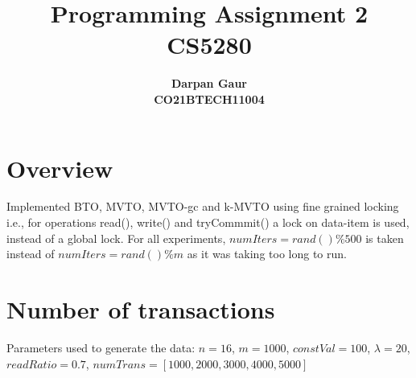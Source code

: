 \documentclass[12pt]{article}
\title{
    \textbf{Programming Assignment 2} \\ 
    \textbf{CS5280} \\
}
\author{
    \textbf{Darpan Gaur} \\
    \textbf{CO21BTECH11004}
}
\date{}
\begin{document}
\maketitle

\hrulefill

\section*{Overview}
Implemented BTO, MVTO, MVTO-gc and k-MVTO using fine grained locking i.e., for operations read(), write() and tryCommmit() a lock on data-item is used, instead of a global lock.
For all experiments, $numIters=rand()\%500$ is taken instead of $numIters=rand()\%m$ as it was taking too long to run.

\section*{Number of transactions}
Parameters used to generate the data:
$n=16$, $m=1000$, $constVal=100$, $\lambda=20$, $readRatio=0.7$, $numTrans = [1000, 2000, 3000, 4000, 5000]$
\end{document}
